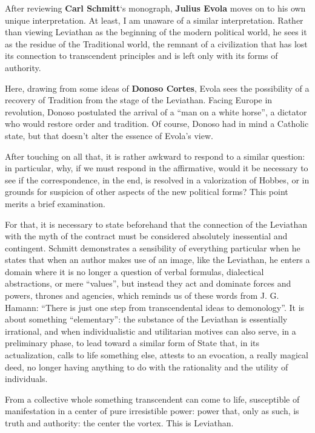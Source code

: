 \begin{quotationx}
After reviewing \textbf{Carl Schmitt}`s monograph, \textbf{Julius Evola} moves on to his own unique interpretation. At least, I am unaware of a similar interpretation. Rather than viewing Leviathan as the beginning of the modern political world, he sees it as the residue of the Traditional world, the remnant of a civilization that has lost its connection to transcendent principles and is left only with its forms of authority.

Here, drawing from some ideas of \textbf{Donoso Cortes}, Evola sees the possibility of a recovery of Tradition from the stage of the Leviathan. Facing Europe in revolution, Donoso postulated the arrival of a ``man on a white horse'', a dictator who would restore order and tradition. Of course, Donoso had in mind a Catholic state, but that doesn't alter the essence of Evola's view.
\end{quotationx}


After touching on all that, it is rather awkward to respond to a similar question: in particular, why, if we must respond in the affirmative, would it be necessary to see if the correspondence, in the end, is resolved in a valorization of Hobbes, or in grounds for suspicion of other aspects of the new political forms? This point merits a brief examination.

For that, it is necessary to state beforehand that the connection of the Leviathan with the myth of the contract must be considered absolutely inessential and contingent. Schmitt demonstrates a sensibility of everything particular when he states that when an author makes use of an image, like the Leviathan, he enters a domain where it is no longer a question of verbal formulas, dialectical abstractions, or mere ``values'', but instead they act and dominate forces and powers, thrones and agencies, which reminds us of these words from J. G. Hamann: ``There is just one step from transcendental ideas to demonology''. It is about something ``elementary'': the substance of the Leviathan is essentially irrational, and when individualistic and utilitarian motives can also serve, in a preliminary phase, to lead toward a similar form of State that, in its actualization, calls to life something else, attests to an evocation, a really magical deed, no longer having anything to do with the rationality and the utility of individuals.

From a collective whole something transcendent can come to life, susceptible of manifestation in a center of pure irresistible power: power that, only as such, is truth and authority: the center the vortex. This is Leviathan.

